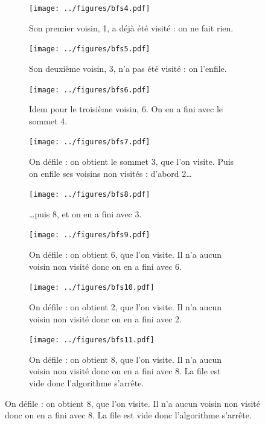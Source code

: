 \documentclass{article}
\begin{document}
\begin{itemize}
\begin{figure}[b]
		\begin{subfigure}[t]{0.3\linewidth}
			\centering
			\texttt{[image: ../figures/bfs4.pdf]}
			\caption{Son premier voisin, 1, a déjà été visité : on ne fait rien.}
		\end{subfigure}\hfill%
		\begin{subfigure}[t]{0.3\linewidth}
			\centering
			\texttt{[image: ../figures/bfs5.pdf]}
			\caption{Son deuxième voisin, 3, n'a pas été visité : on l'enfile.}
		\end{subfigure}\hfill%
		\begin{subfigure}[t]{0.3\linewidth}
			\centering
			\texttt{[image: ../figures/bfs6.pdf]}
			\caption{Idem pour le troisième voisin, 6. On en a fini avec le sommet 4.}
		\end{subfigure}
	
		\begin{subfigure}[t]{0.3\linewidth}
			\centering
			\texttt{[image: ../figures/bfs7.pdf]}
			\caption{On défile : on obtient le sommet 3, que l'on visite. Puis on enfile ses voisins non visités : d'abord 2\ldots}
		\end{subfigure}\hfill%
		\begin{subfigure}[t]{0.3\linewidth}
			\centering
			\texttt{[image: ../figures/bfs8.pdf]}
			\caption{\ldots puis 8, et on en a fini avec 3.}
		\end{subfigure}\hfill%
		\begin{subfigure}[t]{0.3\linewidth}
			\centering
			\texttt{[image: ../figures/bfs9.pdf]}
			\caption{On défile : on obtient 6, que l'on visite. Il n'a aucun voisin non visité donc on en a fini avec 6.}
		\end{subfigure}
	
		\begin{subfigure}[t]{0.45\linewidth}
			\centering
			\texttt{[image: ../figures/bfs10.pdf]}
			\caption{On défile : on obtient 2, que l'on visite. Il n'a aucun voisin non visité donc on en a fini avec 2.}
		\end{subfigure}\hfill%
		\begin{subfigure}[t]{0.45\linewidth}
			\centering
			\texttt{[image: ../figures/bfs11.pdf]}
			\caption{On défile : on obtient 8, que l'on visite. Il n'a aucun voisin non visité donc on en a fini avec 8. La file est vide donc l'algorithme s'arrête.}
		\end{subfigure}
	\end{figure}
\end{itemize}
\end{document}
